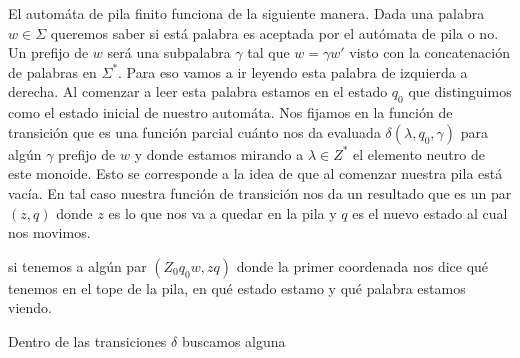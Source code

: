 \documentclass[tesis.tex]{subfiles}
\begin{document}
El automáta de pila finito funciona de la siguiente manera. Dada una palabra $w \in \Sigma$ queremos saber si está palabra es aceptada por el autómata de pila o no. Un prefijo de $w$ será una subpalabra $\gamma$ tal que $w=\gamma w'$ visto con la concatenación de palabras en $\Sigma^*$. 
Para eso vamos a ir leyendo esta palabra de izquierda a derecha. Al comenzar a leer esta palabra estamos en el estado $q_0$ que distinguimos como el estado inicial de nuestro automáta. Nos fijamos en la función de transición que es una función parcial cuánto nos da evaluada  $\delta(\lambda,q_0,\gamma)$ para algún $\gamma$ prefijo de $w$ y donde estamos mirando a $\lambda \in Z^*$ el elemento neutro de este monoide. Esto se corresponde a la idea de que al comenzar nuestra pila está vacía. En tal caso nuestra función de transición nos da un resultado que es un par $(z,q)$ donde $z$ es lo que nos va a quedar en la pila y $q$ es el nuevo estado al cual nos movimos.

si tenemos a algún par $(Z_0 q_0 w, z q)$ donde la primer coordenada nos dice qué tenemos en el tope de la pila, en qué estado estamo y qué palabra estamos viendo.

Dentro de las transiciones $\delta$ buscamos alguna
 
\end{document}
